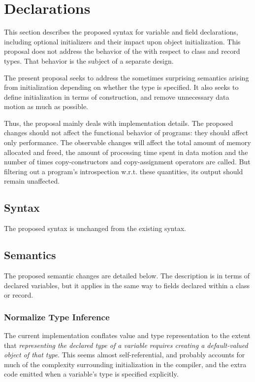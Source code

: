 \section{Declarations}
\label{Declarations}

This section describes the proposed syntax for variable and field declarations, including
optional initializers and their impact upon object initialization.  This proposal does not
address the behavior of the  with respect to class and record
types.  That behavior is the subject of a separate design.

The present proposal seeks to address the sometimes surprising semantics arising from
initialization depending on whether the type is specified.  It also seeks to define
initialization in terms of construction, and remove unnecessary data motion as much as
possible.

Thus, the proposal mainly deals with implementation details.  The proposed changes should
not affect the functional behavior of programs: they should affect only performance.  The
observable changes will affect the total amount of memory allocated and freed, the amount
of processing time spent in data motion and the number of times copy-constructors and
copy-assignment operators are called.  But filtering out a program's introspection
w.r.t. these quantities, its output should remain unaffected.

\subsection{Syntax}

The proposed syntax is unchanged from the existing syntax.

\subsection{Semantics}

The proposed semantic changes are detailed below.  The description is in terms of declared
variables, but it applies in the same way to fields declared within a class or record.

\subsubsection{Normalize Type Inference}

The current implementation conflates value and type representation to the extent that
\emph{representing the declared type of a variable requires creating a default-valued
  object of that type}.  This seems almost self-referential, and probably accounts for
much of the complexity surrounding initialization in the compiler, and the extra code
emitted when a variable's type is specified explicitly.

